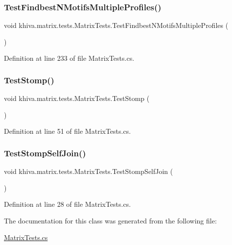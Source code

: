 \subsubsection{\texorpdfstring{Test\+Findbest\+N\+Motifs\+Multiple\+Profiles()}{TestFindbestNMotifsMultipleProfiles()}}
{\footnotesize\ttfamily void khiva.\+matrix.\+tests.\+Matrix\+Tests.\+Test\+Findbest\+N\+Motifs\+Multiple\+Profiles (\begin{DoxyParamCaption}{ }\end{DoxyParamCaption})\hspace{0.3cm}{\ttfamily [inline]}}



Definition at line 233 of file Matrix\+Tests.\+cs.

\mbox{\label{classkhiva_1_1matrix_1_1tests_1_1_matrix_tests_a01d81245f9551d73740fd1d2abbbd134}} 
\subsubsection{\texorpdfstring{Test\+Stomp()}{TestStomp()}}
{\footnotesize\ttfamily void khiva.\+matrix.\+tests.\+Matrix\+Tests.\+Test\+Stomp (\begin{DoxyParamCaption}{ }\end{DoxyParamCaption})\hspace{0.3cm}{\ttfamily [inline]}}



Definition at line 51 of file Matrix\+Tests.\+cs.

\mbox{\label{classkhiva_1_1matrix_1_1tests_1_1_matrix_tests_aa0b35c45818a0adc9aa1d6fc44093a80}} 
\subsubsection{\texorpdfstring{Test\+Stomp\+Self\+Join()}{TestStompSelfJoin()}}
{\footnotesize\ttfamily void khiva.\+matrix.\+tests.\+Matrix\+Tests.\+Test\+Stomp\+Self\+Join (\begin{DoxyParamCaption}{ }\end{DoxyParamCaption})\hspace{0.3cm}{\ttfamily [inline]}}



Definition at line 28 of file Matrix\+Tests.\+cs.



The documentation for this class was generated from the following file\+:\begin{DoxyCompactItemize}
\item 
\mbox{\hyperlink{_matrix_tests_8cs}{Matrix\+Tests.\+cs}}\end{DoxyCompactItemize}
